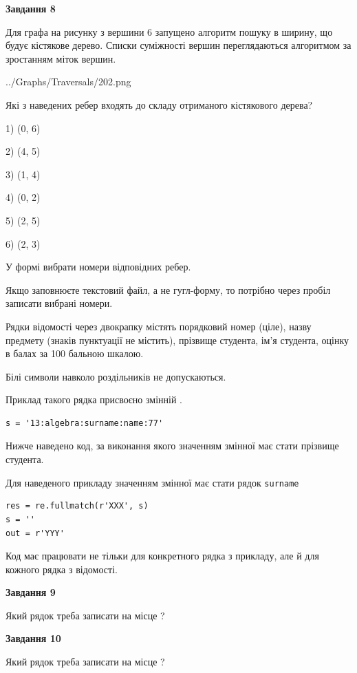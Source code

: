 \documentclass[12pt, ukrainian]{article}
\def\code#1{\Verb!#1!}
\begin{document}
{\begin {large}
{\begin {center}\textbf{Завдання 8}\end {center}}\par
Для графа на рисунку з вершини 6 запущено алгоритм пошуку в ширину, що будує кістякове дерево. Списки суміжності вершин переглядаються алгоритмом за зростанням міток вершин.\par
\begin{center}
	{../Graphs/Traversals/202.png}
\end{center}
\par Які з наведених ребер входять до складу отриманого кістякового дерева?\par
1) (0, 6)\par
2) (4, 5)\par
3) (1, 4)\par
4) (0, 2)\par
5) (2, 5)\par
6) (2, 3)\par
{\vskip 15pt} У формі вибрати номери відповідних ребер.


Якщо заповнюєте текстовий файл, а не гугл-форму, то потрібно через пробіл записа\-ти вибрані номери.\par
\newpage


Рядки відомості через двокрапку містять порядковий номер (ціле), назву предмету (знаків пунктуації не містить), прізвище студента, ім'я студента, оцінку в балах за 100 бальною шкалою.

Білі символи навколо роздільників не допускаються.

Приклад такого рядка присвоєно змінній .



\begin{verbatim}
s = '13:algebra:surname:name:77'
\end{verbatim}


Нижче наведено код, за виконання якого значенням змінної  має стати прізвище студента.

Для наведеного прикладу значенням змінної  має стати рядок \code{surname}



\begin{verbatim}
res = re.fullmatch(r'XXX', s)
s = ''
out = r'YYY'
\end{verbatim}


Код має працювати не тільки для конкретного рядка з прикладу, але й для кожного рядка з відомості.

{\begin {center}\textbf{Завдання 9}\end {center}}\par
Який рядок треба записати на місце  ?\par
\vspace{5mm}


{\begin {center}\textbf{Завдання 10}\end {center}}\par
Який рядок треба записати на місце  ?\par


\newpage


\end {large}}
\end{document}
